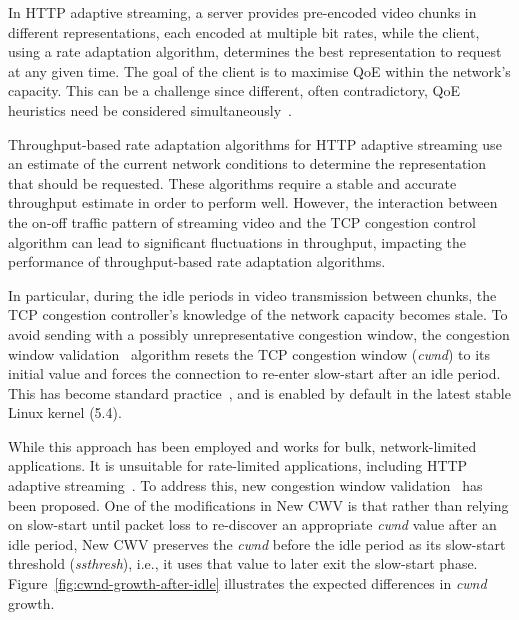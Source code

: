 \documentclass[10pt,sigconf,anonymous]{acmart}
\begin{document}
In HTTP adaptive streaming, a server provides pre-encoded video chunks in different representations, each encoded at multiple bit rates, while the client, using a rate adaptation algorithm, determines the best representation to request at any given time. The goal of the client is to maximise QoE within the network's capacity. This can be a challenge since different, often contradictory, QoE heuristics need be considered simultaneously~\cite{Seufert-2015-A-Survey-on-QoE-Dash}. 

Throughput-based rate adaptation algorithms for HTTP adaptive streaming use an estimate of the current network conditions to determine the representation that should be requested. These algorithms require a stable and accurate throughput estimate in order to perform well. However, the interaction between the on-off traffic pattern of streaming video and the TCP congestion control algorithm can lead to significant fluctuations in throughput, impacting the performance of throughput-based rate adaptation algorithms.


In particular, during the idle periods in video transmission between chunks, the TCP congestion controller's knowledge of the network capacity becomes stale. To avoid sending with a possibly unrepresentative congestion window, the congestion window validation~\cite{rfc2861-2000-padhye-congestion-window-validation} algorithm resets the TCP congestion window (\emph{cwnd}) to its initial value and forces the connection to re-enter slow-start after an idle period. This has become standard practice~\cite{rfc5681-congeston-control}, and is enabled by default in the latest stable Linux kernel (5.4).

While this approach has been employed and works for bulk, network-limited applications. It is unsuitable for rate-limited applications, including HTTP adaptive streaming~\cite{Esteban-2012-Interactions-HTTP-TCP}. To address this, new congestion window validation~\cite{rfc7661-2015-fairhurst-new-cwnd-validation} has been proposed. One of the modifications in New CWV is that rather than relying on slow-start until packet loss to re-discover an appropriate \emph{cwnd} value after an idle period, New CWV preserves the \emph{cwnd} before the idle period as its slow-start threshold (\emph{ssthresh}), i.e., it uses that value to later exit the slow-start phase. Figure~\ref{fig:cwnd-growth-after-idle} illustrates the expected differences in \emph{cwnd} growth.
\end{document}
